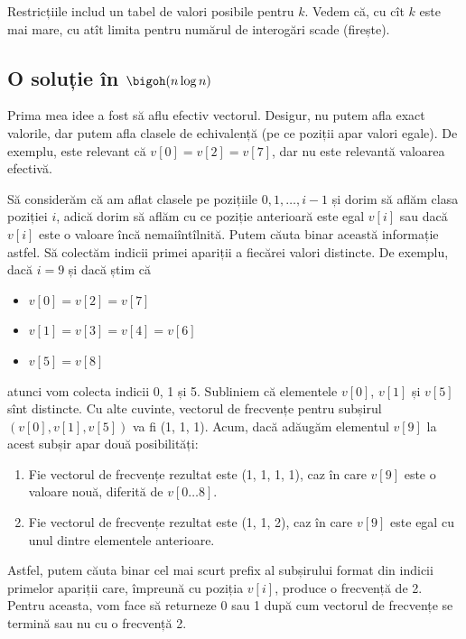 Restricțiile includ un tabel de valori posibile pentru $k$. Vedem că, cu cît $k$ este mai mare, cu atît limita pentru numărul de interogări scade (firește).

\subsection{O soluție în \texorpdfstring{$\bigoh(n \log n)$}{O(n log n)}}

Prima mea idee a fost să aflu efectiv vectorul. Desigur, nu putem afla exact valorile, dar putem afla clasele de echivalență (pe ce poziții apar valori egale). De exemplu, este relevant că $v[0] = v[2] = v[7]$, dar nu este relevantă valoarea efectivă.

Să considerăm că am aflat clasele pe pozițiile $0, 1, \dots, i-1$ și dorim să aflăm clasa poziției $i$, adică dorim să aflăm cu ce poziție anterioară este egal $v[i]$ sau dacă $v[i]$ este o valoare încă nemaiîntîlnită. Putem căuta binar această informație astfel. Să colectăm indicii primei apariții a fiecărei valori distincte. De exemplu, dacă $i = 9$ și dacă știm că

\begin{itemize}
  \item $v[0] = v[2] = v[7]$
  \item $v[1] = v[3] = v[4] = v[6]$
  \item $v[5] = v[8]$
\end{itemize}

atunci vom colecta indicii 0, 1 și 5. Subliniem că elementele $v[0]$, $v[1]$ și $v[5]$ sînt distincte. Cu alte cuvinte, vectorul de frecvențe pentru subșirul $(v[0], v[1], v[5])$ va fi (1, 1, 1). Acum, dacă adăugăm elementul $v[9]$ la acest subșir apar două posibilități:

\begin{enumerate}
  \item Fie vectorul de frecvențe rezultat este (1, 1, 1, 1), caz în care $v[9]$ este o valoare nouă, diferită de $v[0 \dots 8]$.

  \item Fie vectorul de frecvențe rezultat este (1, 1, 2), caz în care $v[9]$ este egal cu unul dintre elementele anterioare.
\end{enumerate}

Astfel, putem căuta binar cel mai scurt prefix al subșirului format din indicii primelor apariții care, împreună cu poziția $v[i]$, produce o frecvență de 2. Pentru aceasta, vom face  să returneze 0 sau 1 după cum vectorul de frecvențe se termină sau nu cu o frecvență 2.

